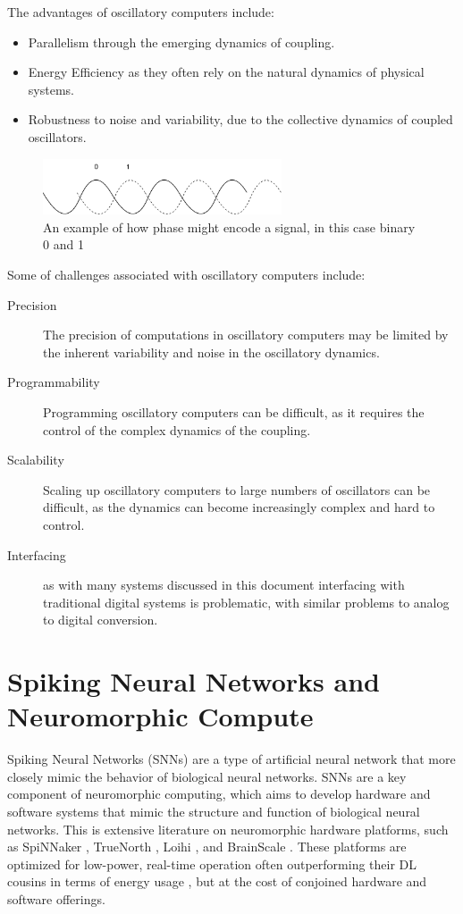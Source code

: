 \documentclass{article}
\begin{document}
The advantages of oscillatory computers include:

\begin{itemize}
	\item Parallelism through the emerging dynamics of coupling.
	\item Energy Efficiency as they often rely on the natural dynamics of physical systems.
	\item Robustness to noise and variability, due to the collective dynamics of coupled oscillators.
\end{itemize}

\begin{figure}
	\centerline{\includegraphics[width=200pt]{figures/oscil.png}}
	\caption{An example of how phase might encode a signal, in this case binary 0 and 1}\label{fig:fig2}
\end{figure}

Some of challenges associated with oscillatory computers include:

\begin{description}
	\item[Precision] The precision of computations in oscillatory computers may be limited by the inherent variability and noise in the oscillatory dynamics.
	\item[Programmability] Programming oscillatory computers can be difficult, as it requires the control of the complex dynamics of the coupling.
	\item[Scalability] Scaling up oscillatory computers to large numbers of oscillators can be difficult, as the dynamics can become increasingly complex and hard to control.
	\item[Interfacing] as with many systems discussed in this document interfacing with traditional digital systems is problematic, with similar problems to analog to digital conversion.
\end{description}

\section{Spiking Neural Networks and Neuromorphic Compute}\label{neuro}

Spiking Neural Networks (SNNs) \cite{maass2001pulsed} are a type of artificial neural network that more closely mimic the behavior of biological neural networks. SNNs are a key component of neuromorphic computing, which aims to develop hardware and software systems that mimic the structure and function of biological neural networks. This is extensive literature on neuromorphic hardware platforms, such as SpiNNaker \cite{furber2016large,furber2014spinnaker}, TrueNorth \cite{sawada2016truenorth}, Loihi \cite{davies2018loihi}, and BrainScale \cite{schmitt2017neuromorphic}. These platforms are optimized for low-power, real-time operation often outperforming their DL cousins in terms of energy usage \cite{reuther20}, but at the cost of conjoined hardware and software offerings.
\end{document}
